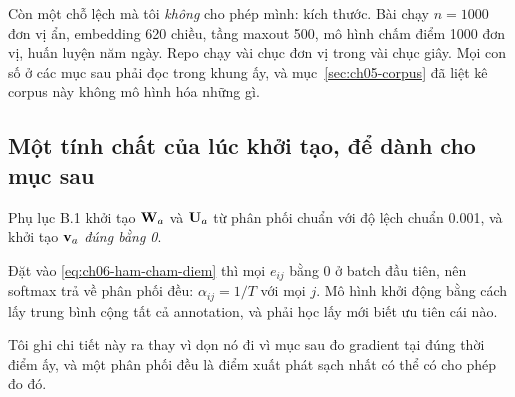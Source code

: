 Còn một chỗ lệch mà tôi \emph{không} cho phép mình: kích thước. Bài chạy
\(n = 1000\) đơn vị ẩn, embedding 620 chiều, tầng maxout 500, mô hình chấm điểm
1000 đơn vị, huấn luyện năm ngày. Repo chạy vài chục đơn vị trong vài chục
giây. Mọi con số ở các mục sau phải đọc trong khung ấy, và
mục~\ref{sec:ch05-corpus} đã liệt kê corpus này không mô hình hóa những gì.

\subsection*{Một tính chất của lúc khởi tạo, để dành cho mục sau}

%
Phụ lục B.1 khởi tạo \(\mathbf{W}_a\) và \(\mathbf{U}_a\) từ phân phối chuẩn với độ
lệch chuẩn 0.001, và khởi tạo \(\mathbf{v}_a\) \emph{đúng bằng 0}.

Đặt vào \eqref{eq:ch06-ham-cham-diem} thì mọi \(e_{ij}\) bằng 0 ở batch đầu
tiên, nên softmax trả về phân phối đều: \(\alpha_{ij} = 1/T\) với mọi \(j\).
Mô hình khởi động bằng cách lấy trung bình cộng tất cả annotation, và phải học
lấy mới biết ưu tiên cái nào.

Tôi ghi chi tiết này ra thay vì dọn nó đi vì mục sau đo gradient tại đúng thời
điểm ấy, và một phân phối đều là điểm xuất phát sạch nhất có thể có cho phép đo
đó.
